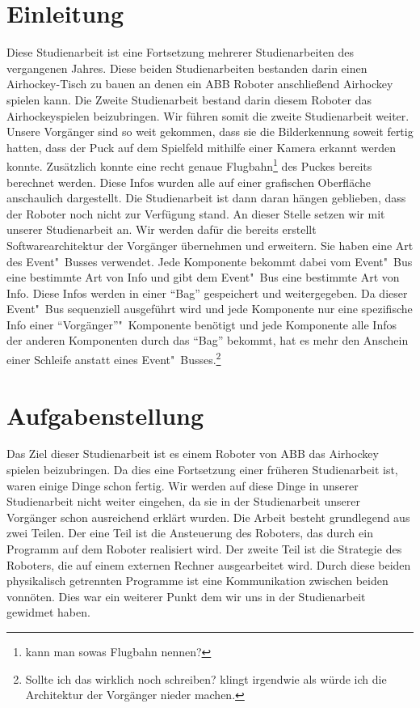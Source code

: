 
\chapter{Einleitung}
Diese Studienarbeit ist eine Fortsetzung mehrerer Studienarbeiten des vergangenen Jahres. Diese beiden Studienarbeiten bestanden darin einen Airhockey-Tisch zu bauen an denen ein ABB Roboter anschließend Airhockey spielen kann. Die Zweite Studienarbeit bestand darin diesem Roboter das Airhockeyspielen beizubringen. Wir führen somit die zweite Studienarbeit weiter. Unsere Vorgänger sind so weit gekommen, dass sie die Bilderkennung soweit fertig hatten, dass der Puck auf dem Spielfeld mithilfe einer Kamera erkannt werden konnte. Zusätzlich konnte eine recht genaue Flugbahn\footnote{kann man sowas Flugbahn nennen?} des Puckes bereits berechnet werden. Diese Infos wurden alle auf einer grafischen Oberfläche anschaulich dargestellt. Die Studienarbeit ist dann daran hängen geblieben, dass der Roboter noch nicht zur Verfügung stand. An dieser Stelle setzen wir mit unserer Studienarbeit an. Wir werden dafür die bereits erstellt Softwarearchitektur der Vorgänger übernehmen und erweitern. Sie haben eine Art des Event"~Busses verwendet. Jede Komponente bekommt dabei vom Event"~Bus eine bestimmte Art von Info und gibt dem Event"~Bus eine bestimmte Art von Info. Diese Infos werden in einer \enquote{Bag} gespeichert und weitergegeben. Da dieser Event"~Bus sequenziell ausgeführt wird und jede Komponente nur eine spezifische Info einer \enquote{Vorgänger}"~Komponente benötigt und jede Komponente alle Infos der anderen Komponenten durch das \enquote{Bag} bekommt, hat es mehr den Anschein einer Schleife anstatt eines Event"~Busses.\footnote{Sollte ich das wirklich noch schreiben? klingt irgendwie als würde ich die Architektur der Vorgänger nieder machen.}

\newpage

\chapter{Aufgabenstellung}
Das Ziel dieser Studienarbeit ist es einem Roboter von ABB das Airhockey spielen beizubringen. Da dies eine Fortsetzung einer früheren Studienarbeit ist, waren einige Dinge schon fertig. Wir werden auf diese Dinge in unserer Studienarbeit nicht weiter eingehen, da sie in der Studienarbeit unserer Vorgänger schon ausreichend erklärt wurden. Die Arbeit besteht grundlegend aus zwei Teilen. Der eine Teil ist die Ansteuerung des Roboters, das durch ein Programm auf dem Roboter realisiert wird. Der zweite Teil ist die Strategie des Roboters, die auf einem externen Rechner ausgearbeitet wird.
Durch diese beiden physikalisch getrennten Programme ist eine Kommunikation zwischen beiden vonnöten. Dies war ein weiterer Punkt dem wir uns in der Studienarbeit gewidmet haben.

